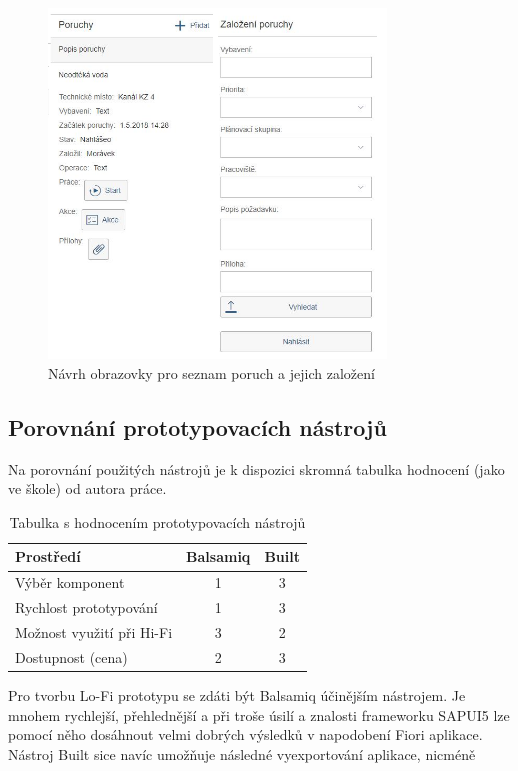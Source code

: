 \documentclass[thesis=M,czech]{FITthesis}[2012/06/26]
\begin{document}
\begin{figure}[H]
	\centering
	\includegraphics[width=0.8\textwidth]{images/bu_mob}
	\caption{Návrh obrazovky pro seznam poruch a jejich založení}
	\label{img:bu_mob}
\end{figure}

\subsection{Porovnání prototypovacích nástrojů}
Na porovnání použitých nástrojů je k dispozici skromná tabulka hodnocení (jako ve škole) od autora práce.
\begin{center}
	\begin{table}[H]
		\centering
		\begin{tabular}{| l | c | c |}
			\hline 
			Prostředí 						& Balsamiq 	&	Built		\\ 
			\hline	
			\hline
			Výběr komponent					&	1		&	3			\\ 
			\hline
			Rychlost prototypování			&	1		&	3			\\
			\hline
			Možnost využití při Hi-Fi		&	3		&	2			\\
			\hline
			Dostupnost (cena)				&	2		&	3			\\
			\hline		
		\end{tabular}
		\caption {Tabulka s hodnocením prototypovacích nástrojů} 
		\label{tab:prototyp_comp}
	\end{table}
\end{center}
Pro tvorbu Lo-Fi prototypu se zdáti být Balsamiq účinějším nástrojem. Je mnohem rychlejší, přehlednější a při troše úsilí a znalosti frameworku SAPUI5 lze pomocí něho dosáhnout velmi dobrých výsledků v napodobení Fiori aplikace. Nástroj Built sice navíc umožňuje následné vyexportování aplikace, nicméně 
\end{document}
